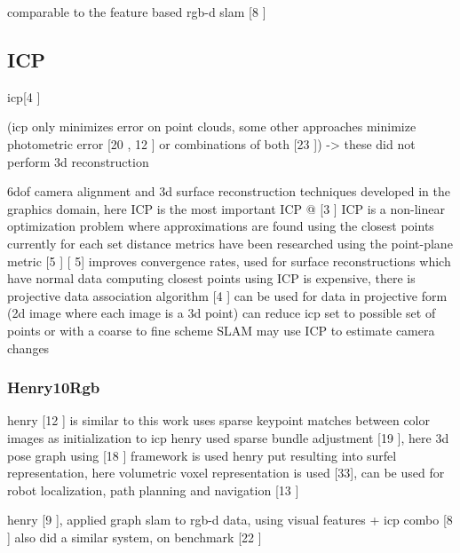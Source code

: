 comparable to the feature based rgb-d slam [8 \cite{Endres12Evaluation}]

\subsection{ICP}

icp[4 \cite{Besl92Method}]

(icp only minimizes error on point clouds, some other approaches minimize photometric error [20 \cite{Steinbrucker11Real}, 12 \cite{Kerl13Robust}] or combinations of both [23 \cite{Tykkala11Direct}]) -> these did not perform 3d reconstruction

6dof camera alignment and 3d surface reconstruction techniques developed in the graphics domain, here ICP is the most important
ICP @ [3 \cite{Besl92Method} ]
ICP is a non-linear optimization problem where approximations are found using the closest points currently for each
set
distance metrics have been researched using the point-plane metric [5 \cite{Chen92Object}]
[\cite{Chen92Object} 5] improves convergence rates, used for surface reconstructions which have normal data
computing closest points using ICP is expensive, there is projective data association algorithm [4 \cite{Blais95Registering}]
can be used for data in projective form (2d image where each image is a 3d point)
can reduce icp set to possible set of points or with a coarse to fine scheme
SLAM may use ICP to estimate camera changes





\subsubsection{Henry10Rgb}

henry [12 \cite{Henry10Rgb,Henry14Rgb}] is similar to this work \cite{Endres12Evaluation}
uses sparse keypoint matches between color images as initialization to icp
henry used sparse bundle adjustment [19 \cite{Lourakis09Sba} ], here 3d pose graph using [18 \cite{Kummerle11G}] framework is used
henry put resulting into surfel representation, here volumetric voxel representation is used [33], can be used for robot localization, path planning and navigation [13 \cite{Hornung10Humanoid}]

henry [9 \cite{Henry10Rgb}], applied graph slam to rgb-d data, using visual features + icp combo [8 \cite{Endres12Evaluation} ] also did a similar system, on benchmark [22 \cite{Sturm12Benchmark}]


